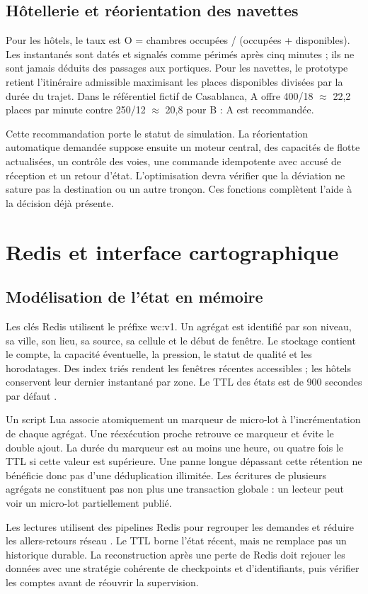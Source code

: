 \documentclass[a4paper,11pt]{article}
\begin{document}
\subsection{Hôtellerie et réorientation des navettes}
Pour les hôtels, le taux est O = chambres occupées / (occupées + disponibles). Les instantanés sont datés et signalés comme périmés après cinq minutes ; ils ne sont jamais déduits des passages aux portiques. Pour les navettes, le prototype retient l'itinéraire admissible maximisant les places disponibles divisées par la durée du trajet. Dans le référentiel fictif de Casablanca, A offre 400/18 \(\approx\) 22,2 places par minute contre 250/12 \(\approx\) 20,8 pour B : A est recommandée.
\par
Cette recommandation porte le statut de simulation. La réorientation automatique demandée suppose ensuite un moteur central, des capacités de flotte actualisées, un contrôle des voies, une commande idempotente avec accusé de réception et un retour d'état. L'optimisation devra vérifier que la déviation ne sature pas la destination ou un autre tronçon. Ces fonctions complètent l'aide à la décision déjà présente.
\par

\clearpage
\section{Redis et interface cartographique}\label{sec:6}
\subsection{Modélisation de l'état en mémoire}
Les clés Redis utilisent le préfixe {\small\ttfamily wc:v1}. Un agrégat est identifié par son niveau, sa ville, son lieu, sa source, sa cellule et le début de fenêtre. Le stockage contient le compte, la capacité éventuelle, la pression, le statut de qualité et les horodatages. Des index triés rendent les fenêtres récentes accessibles ; les hôtels conservent leur dernier instantané par zone. Le TTL des états est de 900 secondes par défaut \cite{ref2}.
\par
Un script Lua associe atomiquement un marqueur de micro-lot à l'incrémentation de chaque agrégat. Une réexécution proche retrouve ce marqueur et évite le double ajout. La durée du marqueur est au moins une heure, ou quatre fois le TTL si cette valeur est supérieure. Une panne longue dépassant cette rétention ne bénéficie donc pas d'une déduplication illimitée. Les écritures de plusieurs agrégats ne constituent pas non plus une transaction globale : un lecteur peut voir un micro-lot partiellement publié.
\par
Les lectures utilisent des pipelines Redis pour regrouper les demandes et réduire les allers-retours réseau \cite{ref6}. Le TTL borne l'état récent, mais ne remplace pas un historique durable. La reconstruction après une perte de Redis doit rejouer les données avec une stratégie cohérente de checkpoints et d'identifiants, puis vérifier les comptes avant de réouvrir la supervision.
\par
\end{document}
